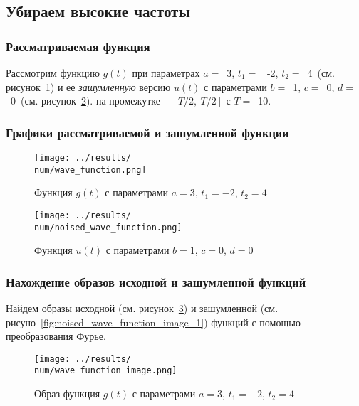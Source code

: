 \subsection{Убираем высокие частоты}

\def\num{1}
\def\a{3}
\def\from{-2}
\def\to{4}
\def\b{1}
\def\c{0}
\def\d{0}
\def\T{10}
\def\imageclip{10}

\subsubsection{Рассматриваемая функция}
Рассмотрим функцию $g(t)$ при параметрах $a=$~\a, $t_1 =$~ \from, $t_2 =$~\to ~(см. рисунок~\ref{fig:wave_function_\num}) 
и ее \textit{зашумленную} версию $u(t)$ с параметрами $b =$~\b, $c =$~\c, $d =$~\d ~(см. рисунок~\ref{fig:noised_wave_function_\num}).
на промежутке $[-T/2,~T/2]$ с $T =$~\T.

\FloatBarrier
\subsubsection{Графики рассматриваемой и зашумленной функции}
\begin{figure}[ht!]
    \centering
    \texttt{[image: ../results/\\num/wave\_function.png]}
    \caption{Функция $g(t)$ с параметрами $a = \a$, $t_1 = \from$, $t_2 = \to$}
    \label{fig:wave_function_\num}
\end{figure}

\begin{figure}[ht!]
    \centering
    \texttt{[image: ../results/\\num/noised\_wave\_function.png]}
    \caption{Функция $u(t)$ с параметрами $b = \b$, $c = \c$, $d = \d$}
    \label{fig:noised_wave_function_\num}
\end{figure}

\FloatBarrier
\subsubsection{Нахождение образов исходной и зашумленной функций}
Найдем образы исходной (см. рисунок~\ref{fig:wave_function_image_\num}) 
и зашумленной (см. рисуно~\ref{fig:noised_wave_function_image_\num}) функций с помощью преобразования Фурье. 

\begin{figure}[ht!]
    \centering
    \texttt{[image: ../results/\\num/wave\_function\_image.png]}
    \caption{Образ функция $g(t)$ с параметрами $a = \a$, $t_1 = \from$, $t_2 = \to$}
    \label{fig:wave_function_image_\num}
\end{figure}

